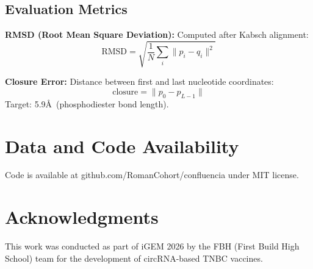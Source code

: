 \documentclass[12pt]{article}
\begin{document}
\subsection{Evaluation Metrics}

\textbf{RMSD (Root Mean Square Deviation):} Computed after Kabsch alignment:
\begin{equation}
\text{RMSD} = \sqrt{\frac{1}{N} \sum_{i} \|p_i - q_i\|^2}
\end{equation}

\textbf{Closure Error:} Distance between first and last nucleotide coordinates:
\begin{equation}
\text{closure} = \|p_0 - p_{L-1}\|
\end{equation}
Target: 5.9\AA\ (phosphodiester bond length).

\section{Data and Code Availability}

Code is available at github.com/RomanCohort/confluencia under MIT license.

\section{Acknowledgments}

This work was conducted as part of iGEM 2026 by the FBH (First Build High School) team for the development of circRNA-based TNBC vaccines.



\end{document}
